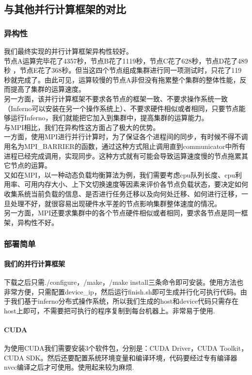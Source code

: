 \documentclass[paper=a4]{ctexart} %
\numberwithin{equation}{section} %
\numberwithin{figure}{section} %
\numberwithin{table}{section} %
\newcommand{\n}{\\\indent}
\begin{document}
\subsection{与其他并行计算框架的对比}

\subsubsection{异构性}

我们最终实现的并行计算框架异构性较好。\n
节点A运算完毕花了4357秒，节点B花了1119秒，节点C花了628秒，节点D花了489秒
，节点E花了368秒。但当这四个节点组成集群进行同一项测试时，只花了119秒就完成了。由此可见，运算较慢的节点A非但没有拖累整个集群的整体性能，反而提高了集群的运算速度。\n
另一方面，该并行计算框架不要求各节点的框架一致、不要求操作系统一致（Inferno可以安装在另一个操作系统上）、不要求硬件相似或者相同，只要节点能够运行Inferno，我们就能把它加入到集群中，提高集群的运算能力。\n
与MPI相比，我们在异构性这方面占了极大的优势。\n
一方面，使用MPI进行并行计算时，为了保证各个进程间的同步，有时候不得不调用名为MPI\_BARRIER的函数，通过这种方式阻止调用直到communicator中所有进程已经完成调用，实现同步。这种方式就有可能会导致运算速度慢的节点拖累其它节点的运算。\n
又如在MPI，以一种动态负载均衡算法为例，我们需要考虑cpu队列长度、cpu利用率、可用内存大小、上下文切换速度等因素来评价各节点负载状态，要决定如何收集系统当前负载的信息、是否进行任务迁移以及向何处迁移、如何进行迁移，一旦处理不好，就很容易出现硬件水平差的节点影响集群整体速度的情况。\n
另一方面，MPI还要求集群中的各个节点硬件相似或者相同，要求各节点是同一框架，异构性不好。

\subsubsection{部署简单}

\paragraph{我们的并行计算框架}

    下载之后只需./configure，/make，/make install三条命令即可安装。使用方法也非常方便，只需配置device\_ip，然后运行finish.sh即可生成并行化可执行代码。由于我们基于inferno分布式操作系统，所以我们生成的host和device代码只需存在host上即可，不需要把可执行的程序复制到每台机器上。非常易于使用.

\paragraph{CUDA}
为使用CUDA我们需要安装3个软件包，分别是：CUDA Driver，CUDA Toolkit，CUDA SDK。然后还要配置系统环境变量和编译环境，代码要经过专有编译器nvcc编译之后才可使用。使用起来较为麻烦.
\end{document}
